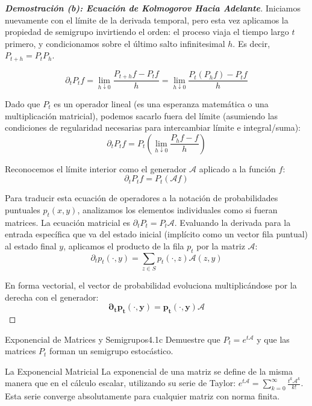 \documentclass[10pt,a4paper]{article}
\begin{document}
\begin{proof}[\textbf{Demostración (b): Ecuación de Kolmogorov Hacia Adelante}]
    Iniciamos nuevamente con el límite de la derivada temporal, pero esta vez aplicamos la propiedad de semigrupo invirtiendo el orden: el proceso viaja el tiempo largo $t$ primero, y condicionamos sobre el último salto infinitesimal $h$. Es decir, $P_{t+h} = P_t P_h$.
    
    \[ \partial_t P_t f = \lim_{h \downarrow 0} \frac{P_{t+h} f - P_t f}{h} = \lim_{h \downarrow 0} \frac{P_t (P_h f) - P_t f}{h} \]

    Dado que $P_t$ es un operador lineal (es una esperanza matemática o una multiplicación matricial), podemos sacarlo fuera del límite (asumiendo las condiciones de regularidad necesarias para intercambiar límite e integral/suma):
    \[ \partial_t P_t f = P_t \left( \lim_{h \downarrow 0} \frac{P_h f - f}{h} \right) \]
    
    Reconocemos el límite interior como el generador $\mathcal{A}$ aplicado a la función $f$:
    \[ \partial_t P_t f = P_t (\mathcal{A} f) \]

    Para traducir esta ecuación de operadores a la notación de probabilidades puntuales $p_t(x,y)$, analizamos los elementos individuales como si fueran matrices. La ecuación matricial es $\partial_t P_t = P_t \mathcal{A}$. 
    Evaluando la derivada para la entrada específica que va del estado inicial (implícito como un vector fila puntual) al estado final $y$, aplicamos el producto de la fila $p_t$ por la matriz $\mathcal{A}$:
    \[ \partial_t p_t(\cdot,y) = \sum_{z \in S} p_t(\cdot, z) \mathcal{A}(z,y) \]
    
    En forma vectorial, el vector de probabilidad evoluciona multiplicándose por la derecha con el generador:
    \[ \mathbf{\partial_t p_t(\cdot, y) = p_t(\cdot, y)\mathcal{A}} \]
\end{proof}

\newpage

\begin{ejercicio}{Exponencial de Matrices y Semigrupos}{4.1c}
    Demuestre que $P_t = e^{t\mathcal{A}}$ y que las matrices $P_t$ forman un semigrupo estocástico.
\end{ejercicio}

\vspace{2mm}

\begin{nota}{La Exponencial Matricial}
    La exponencial de una matriz se define de la misma manera que en el cálculo escalar, utilizando su serie de Taylor: $e^{t\mathcal{A}} = \sum_{k=0}^\infty \frac{t^k \mathcal{A}^k}{k!}$. Esta serie converge absolutamente para cualquier matriz con norma finita.
\end{nota}
\end{document}
